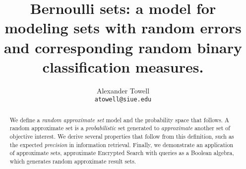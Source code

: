 \documentclass[10pt,final,hidelinks]{article}
\title
{
    Bernoulli sets: a model for modeling sets with random errors\\
    \large and corresponding random binary classification measures.
}
\author
{
    Alexander Towell\\
    \texttt{atowell@siue.edu}
}
\date{}
\numberwithin{equation}{section}
\begin{document}
\maketitle
\begin{abstract}
We define a \emph{random approximate set} model and the probability space that 
follows.
A random approximate set is a \emph{probabilistic} set generated to \emph{approximate} another set of objective interest.
We derive several properties that follow from this definition, such as the expected \emph{precision} in information retrieval.
Finally, we demonstrate an application of approximate sets, approximate Encrypted Search with queries as a Boolean algebra, which generates random approximate result sets.
\end{abstract}

\tableofcontents

%



%










\end{document}
